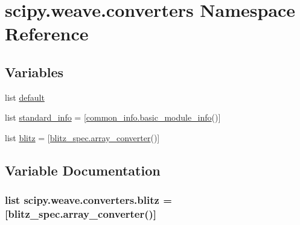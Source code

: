 \hypertarget{namespacescipy_1_1weave_1_1converters}{}\section{scipy.\+weave.\+converters Namespace Reference}
\label{namespacescipy_1_1weave_1_1converters}
\subsection*{Variables}
\begin{DoxyCompactItemize}
\item 
list \hyperlink{namespacescipy_1_1weave_1_1converters_a01f7fe9329af114daf9c47df0fdebe04}{default}
\item 
list \hyperlink{namespacescipy_1_1weave_1_1converters_a2daaef8f4b4ac7524227803d3a6179f7}{standard\+\_\+info} = \mbox{[}\hyperlink{classscipy_1_1weave_1_1common__info_1_1basic__module__info}{common\+\_\+info.\+basic\+\_\+module\+\_\+info}()\mbox{]}
\item 
list \hyperlink{namespacescipy_1_1weave_1_1converters_ac6d73f2d8b3d7b29f29fdae3d820088a}{blitz} = \mbox{[}\hyperlink{classscipy_1_1weave_1_1blitz__spec_1_1array__converter}{blitz\+\_\+spec.\+array\+\_\+converter}()\mbox{]}
\end{DoxyCompactItemize}


\subsection{Variable Documentation}
\hypertarget{namespacescipy_1_1weave_1_1converters_ac6d73f2d8b3d7b29f29fdae3d820088a}{}
\subsubsection[{blitz}]{\setlength{\rightskip}{0pt plus 5cm}list scipy.\+weave.\+converters.\+blitz = \mbox{[}{\bf blitz\+\_\+spec.\+array\+\_\+converter}()\mbox{]}}\label{namespacescipy_1_1weave_1_1converters_ac6d73f2d8b3d7b29f29fdae3d820088a}
\hypertarget{namespacescipy_1_1weave_1_1converters_a01f7fe9329af114daf9c47df0fdebe04}{}

